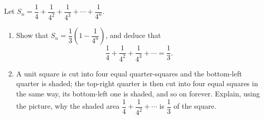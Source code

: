 Let $S_n=\dfrac14+\dfrac1{4^2}+\dfrac1{4^3}+\cdots+\dfrac1{4^n}$.
\begin{enumerate}
\item[(a)] Show that $S_n=\dfrac13\left(1-\dfrac1{4^n}\right)$, and deduce that
\[\dfrac14+\dfrac1{4^2}+\dfrac1{4^3}+\cdots=\dfrac13.\]
\item[(b)] A unit square is cut into four equal quarter-squares and the bottom-left quarter is shaded; the top-right quarter is then cut into four equal squares in the same way, its bottom-left one is shaded, and so on forever. Explain, using the picture, why the shaded area $\dfrac14+\dfrac1{4^2}+\cdots$ is $\dfrac13$ of the square.
\end{enumerate}
